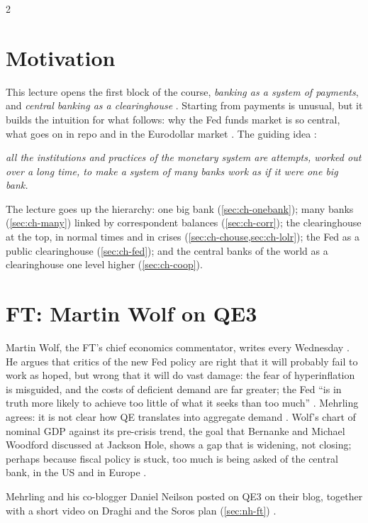 \begin{paracol}{2}
\section*{Motivation}
This lecture opens the first block of the course, \emph{banking as a system of payments}, and \emph{central banking as a clearinghouse}
. Starting from payments is unusual, but it builds the intuition for what follows: why the Fed funds market is so central,
what goes on in repo and in the Eurodollar market . The guiding idea :
\begin{center}
\emph{all the institutions and practices of the monetary system are attempts, worked out over a long time, to make a system of many banks
work as if it were one big bank.}
\end{center}
The lecture goes up the hierarchy: one big bank (\cref{sec:ch-onebank}); many banks (\cref{sec:ch-many}) linked by correspondent balances
(\cref{sec:ch-corr}); the clearinghouse at the top, in normal times and in crises (\cref{sec:ch-chouse,sec:ch-lolr}); the Fed as a public
clearinghouse (\cref{sec:ch-fed}); and the central banks of the world as a clearinghouse one level higher (\cref{sec:ch-coop}).

\section{FT: Martin Wolf on QE3}\label{sec:ch-ft}

\begin{casestudy}
Martin Wolf, the FT's chief economics commentator, writes every Wednesday . He argues that critics of the new Fed policy
are right that it will probably fail to work as hoped, but wrong that it will do vast damage: the fear of hyperinflation is misguided, and
the costs of deficient demand are far greater; the Fed ``is in truth more likely to achieve too little of what it seeks than too much''
. Mehrling agrees: it is not clear how QE translates into aggregate demand . Wolf's chart of nominal GDP
against its pre-crisis trend, the goal that Bernanke and Michael Woodford discussed at Jackson Hole, shows a gap that is widening, not
closing; perhaps because fiscal policy is stuck, too much is being asked of the central bank, in the US and in Europe
.
\end{casestudy}\begin{aside}
Mehrling and his co-blogger Daniel Neilson posted on QE3 on their blog, together with a short video on Draghi and the Soros plan
(\cref{sec:nh-ft}) .
\end{aside}


\end{paracol}
